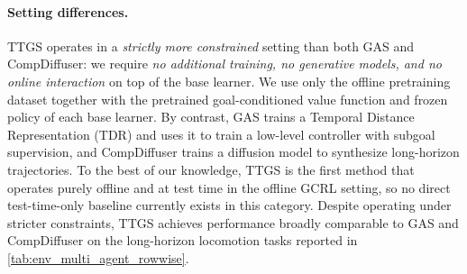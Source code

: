 \documentclass{article} %
\begin{document}
\paragraph{Setting differences.}
TTGS operates in a \emph{strictly more constrained} setting than both GAS and CompDiffuser: we require \emph{no additional training, no generative models, and no online interaction} on top of the base learner. We use only the offline pretraining dataset together with the pretrained goal-conditioned value function and frozen policy of each base learner. By contrast, GAS trains a Temporal Distance Representation (TDR) and uses it to train a low-level controller with subgoal supervision, and CompDiffuser trains a diffusion model to synthesize long-horizon trajectories. To the best of our knowledge, TTGS is the first method that operates purely offline and at test time in the offline GCRL setting, so no direct test-time-only baseline currently exists in this category. Despite operating under stricter constraints, TTGS achieves performance broadly comparable to GAS and CompDiffuser on the long-horizon locomotion tasks reported in \autoref{tab:env_multi_agent_rowwise}.
\end{document}
